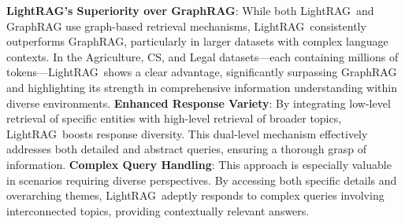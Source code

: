 \documentclass{article} %
\def\model{LightRAG}
\begin{document}
\textbf{\model's Superiority over GraphRAG}: 
While both \model\ and GraphRAG use graph-based retrieval mechanisms, \model\ consistently outperforms GraphRAG, particularly in larger datasets with complex language contexts. In the Agriculture, CS, and Legal datasets—each containing millions of tokens—\model\ shows a clear advantage, significantly surpassing GraphRAG and highlighting its strength in comprehensive information understanding within diverse environments. \textbf{Enhanced Response Variety}: By integrating low-level retrieval of specific entities with high-level retrieval of broader topics, \model\ boosts response diversity. This dual-level mechanism effectively addresses both detailed and abstract queries, ensuring a thorough grasp of information. \textbf{Complex Query Handling}: This approach is especially valuable in scenarios requiring diverse perspectives. By accessing both specific details and overarching themes, \model\ adeptly responds to complex queries involving interconnected topics, providing contextually relevant answers.
\end{document}
